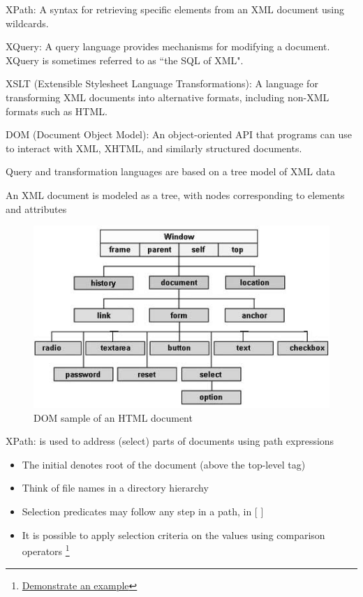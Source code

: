 \documentclass{beamer}
\begin{document}
\begin{slide}{
\item XPath: A syntax for retrieving specific elements from an XML document using wildcards.
\item XQuery: A query language provides mechanisms for modifying a document. XQuery is sometimes referred to as “the SQL of XML".
\item  XSLT (Extensible Stylesheet Language Transformations): A language for transforming XML documents into alternative formats, including non-XML formats such as HTML.
\item DOM (Document Object Model): An object-oriented API that programs can use to interact with XML, XHTML, and similarly structured documents.
}\end{slide}

\begin{slide}{
\item Query and transformation languages are based on a tree model of XML data
\item An XML document is modeled as a tree, with nodes corresponding to elements and attributes
\begin{figure}
		\includegraphics[scale=0.3]{img/html-dom}
		\caption{DOM sample of an HTML document}
\end{figure}
}\end{slide}


\begin{slide}{
\item XPath: is used to address (select) parts of documents using path expressions
\begin{itemize}
\item  The initial denotes root of the document (above the top-level tag) 
\item Think of file names in a directory hierarchy
\item Selection predicates may follow any step in a path, in [ ] 
\item It is possible to apply selection criteria on the values using comparison operators \footnote{ \href{http://www.w3schools.com/xsl/xpath_examples.asp}{Demonstrate an  example}}
\end{itemize}
}\end{slide}
\end{document}
